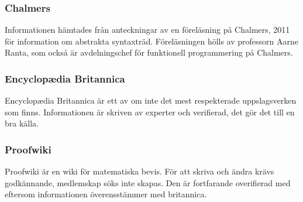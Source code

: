 \documentclass[12pt,a4paper]{article}
\begin{document}
\subsubsection{Chalmers}
Informationen hämtades från anteckningar av en föreläsning på Chalmers, 2011 för information om abstrakta syntaxträd. Föreläsningen hölls av professorn Aarne Ranta, som också är avdelningschef för funktionell programmering på Chalmers.
\subsubsection{Encyclopædia Britannica}
Encyclopædia Britannica är ett av om inte det mest respekterade uppslagsverken som finns. Informationen är skriven av experter och verifierad, det gör det till en bra källa. 
\subsubsection{Proofwiki}
Proofwiki är en wiki för matematiska bevis. För att skriva och ändra krävs godkännande, medlemskap söks inte skapas. Den är fortfarande overifierad med eftersom informationen överensstämmer med britannica.
\end{document}
